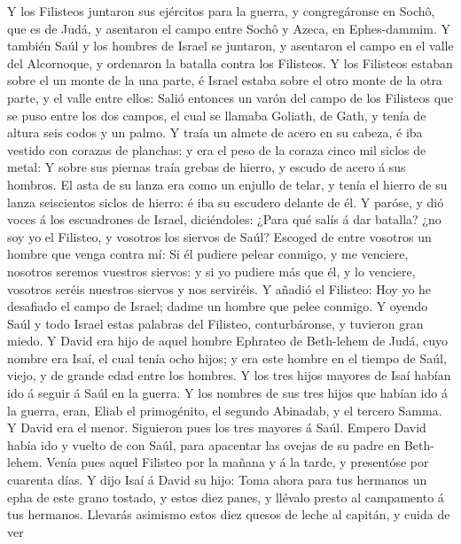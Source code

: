  Y los Filisteos juntaron sus ejércitos para la guerra, y
congregáronse en Sochô, que es de Judá, y asentaron el campo entre Sochô
y Azeca, en Ephes-dammim.  Y también Saúl y los hombres de
Israel se juntaron, y asentaron el campo en el valle del Alcornoque, y
ordenaron la batalla contra los Filisteos.  Y los Filisteos
estaban sobre el un monte de la una parte, é Israel estaba sobre el otro
monte de la otra parte, y el valle entre ellos:  Salió
entonces un varón del campo de los Filisteos que se puso entre los dos
campos, el cual se llamaba Goliath, de Gath, y tenía de altura seis
codos y un palmo.  Y traía un almete de acero en su cabeza,
é iba vestido con corazas de planchas: y era el peso de la coraza cinco
mil siclos de metal:  Y sobre sus piernas traía grebas de
hierro, y escudo de acero á sus hombros.  El asta de su
lanza era como un enjullo de telar, y tenía el hierro de su lanza
seiscientos siclos de hierro: é iba su escudero delante de él.
 Y paróse, y dió voces á los escuadrones de Israel,
diciéndoles: ¿Para qué salís á dar batalla? ¿no soy yo el Filisteo, y
vosotros los siervos de Saúl? Escoged de entre vosotros un hombre que
venga contra mí:  Si él pudiere pelear conmigo, y me
venciere, nosotros seremos vuestros siervos: y si yo pudiere más que él,
y lo venciere, vosotros seréis nuestros siervos y nos serviréis.
 Y añadió el Filisteo: Hoy yo he desafiado el campo de
Israel; dadme un hombre que pelee conmigo.  Y oyendo Saúl y
todo Israel estas palabras del Filisteo, conturbáronse, y tuvieron gran
miedo.  Y David era hijo de aquel hombre Ephrateo de
Beth-lehem de Judá, cuyo nombre era Isaí, el cual tenía ocho hijos; y
era este hombre en el tiempo de Saúl, viejo, y de grande edad entre los
hombres.  Y los tres hijos mayores de Isaí habían ido á
seguir á Saúl en la guerra. Y los nombres de sus tres hijos que habían
ido á la guerra, eran, Eliab el primogénito, el segundo Abinadab, y el
tercero Samma.  Y David era el menor. Siguieron pues los
tres mayores á Saúl.  Empero David había ido y vuelto de
con Saúl, para apacentar las ovejas de su padre en Beth-lehem.
 Venía pues aquel Filisteo por la mañana y á la tarde, y
presentóse por cuarenta días.  Y dijo Isaí á David su hijo:
Toma ahora para tus hermanos un epha de este grano tostado, y estos diez
panes, y llévalo presto al campamento á tus hermanos. 
Llevarás asimismo estos diez quesos de leche al capitán, y cuida de ver
